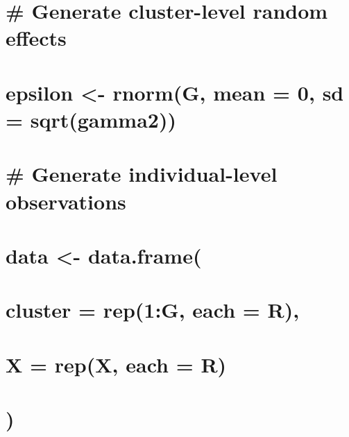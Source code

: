 \documentclass[
]{article}
\begin{document}
\hypertarget{section-4}{%
\section{}\label{section-4}}

\hypertarget{generate-cluster-level-random-effects}{%
\section{\# Generate cluster-level random
effects}\label{generate-cluster-level-random-effects}}

\hypertarget{epsilon---rnormg-mean-0-sd-sqrtgamma2}{%
\section{epsilon \textless- rnorm(G, mean = 0, sd =
sqrt(gamma2))}\label{epsilon---rnormg-mean-0-sd-sqrtgamma2}}

\hypertarget{section-5}{%
\section{}\label{section-5}}

\hypertarget{generate-individual-level-observations}{%
\section{\# Generate individual-level
observations}\label{generate-individual-level-observations}}

\hypertarget{data---data.frame}{%
\section{data \textless- data.frame(}\label{data---data.frame}}

\hypertarget{cluster-rep1g-each-r}{%
\section{cluster = rep(1:G, each = R),}\label{cluster-rep1g-each-r}}

\hypertarget{x-repx-each-r}{%
\section{X = rep(X, each = R)}\label{x-repx-each-r}}

\hypertarget{section-6}{%
\section{)}\label{section-6}}
\end{document}
